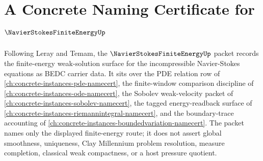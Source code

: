 \chapter{A Concrete Naming Certificate for $\NavierStokesFiniteEnergyUp$}
\label{ch:concrete-instances-navier-stokes-finite-energy-namecert}

Following Leray and Temam, the $\NavierStokesFiniteEnergyUp$ packet records the finite-energy weak-solution surface for the incompressible Navier-Stokes equations as BEDC carrier data. It sits over the PDE relation row of \autoref{ch:concrete-instances-pde-namecert}, the finite-window comparison discipline of \autoref{ch:concrete-instances-ode-namecert}, the Sobolev weak-velocity packet of \autoref{ch:concrete-instances-sobolev-namecert}, the tagged energy-readback surface of \autoref{ch:concrete-instances-riemannintegral-namecert}, and the boundary-trace accounting of \autoref{ch:concrete-instances-boundedvariation-namecert}. The packet names only the displayed finite-energy route; it does not assert global smoothness, uniqueness, Clay Millennium problem resolution, measure completion, classical weak compactness, or a host pressure quotient.


